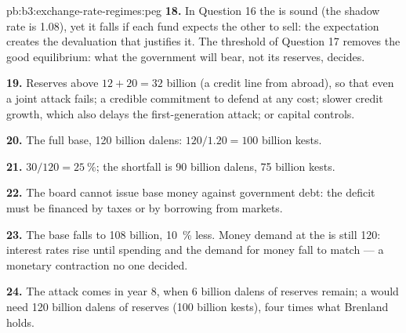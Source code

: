 \begin{solution}{pb:b3:exchange-rate-regimes:peg}
\textbf{18.} In Question 16 the  is sound (the shadow rate is 1.08), yet it falls
if each fund expects the other to sell: the expectation creates the devaluation
that justifies it. The threshold of Question 17 removes the good equilibrium: what
the government will bear, not its reserves, decides.

\textbf{19.} Reserves above $12 + 20 = 32$ billion (a credit line from abroad), so that even a
joint attack fails; a credible commitment to defend at any cost; slower credit
growth, which also delays the first-generation attack; or capital controls.

\textbf{20.} The full base, 120 billion dalens: $120/1.20 = 100$ billion kests.

\textbf{21.} $30/120 = 25~\%$; the shortfall is 90 billion dalens, 75 billion kests.

\textbf{22.} The board cannot issue base money against government debt: the deficit
must be financed by taxes or by borrowing from markets.

\textbf{23.} The base falls to 108 billion, 10~\% less. Money demand at the  is still
120: interest rates rise until spending and the demand for money fall to match
--- a monetary contraction no one decided.

\textbf{24.} The attack comes in year 8, when 6 billion dalens of reserves remain; a
 would need 120 billion dalens of reserves (100 billion kests), four
times what Brenland holds.
\end{solution}
